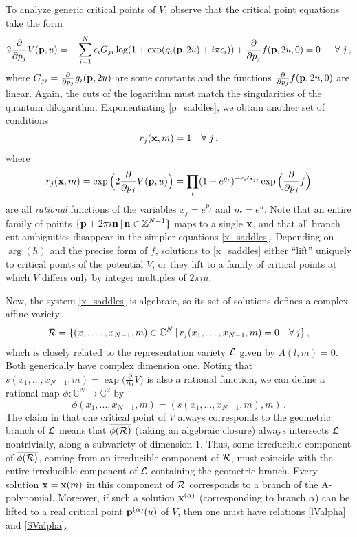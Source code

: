 \documentclass[hyper]{JHEP3}
\def\CL {{\cal L}}
\newcommand{\C}{{\mathbb{C}}}
\newcommand{\Z}{{\mathbb{Z}}}
\newcommand\be{\begin{equation}}
\newcommand\ee{\end{equation}}
\begin{document}
To analyze generic critical points of $V$, observe that the critical point equations
take the form
\be
2 \frac{\partial}{\partial p_j} V({\bf p},u) =
-\sum_{i=1}^{N} \epsilon_i G_{ji} \log(1+\exp(g_i({\bf p},2u)+ i\pi \epsilon_i))
+ \frac{\partial}{\partial p_j} {f} ({\bf p},2u,0) = 0 \quad\;\; \forall\; j\,,
\label{p_saddles}
\ee
where $G_{ji} = \frac{\partial}{\partial p_j} g_i({\bf p},2u)$ are some constants and
the functions $\frac{\partial}{\partial p_j} {f} ({\bf p},2u,0)$ are linear. Again, the cuts of the logarithm must match the singularities of the quantum dilogarithm.
Exponentiating \eqref{p_saddles}, we obtain another set of conditions
\be
r_j ({\bf x},m) = 1 \quad \forall\; j\,,
\label{x_saddles}
\ee
where
\be
r_j({\bf x},m) = \exp \Big( {2 \frac{\partial}{\partial p_j} V({\bf p},u)}\Big)
= \prod_i (1-e^{g_i})^{-\epsilon_i G_{ji}}\exp\Big({\frac{\partial}{\partial p_j}f}\Big)
\ee
%
are all {\it rational} functions of the variables $x_j = e^{p_j}$ and $m = e^u$. Note that an entire family of points $\{{\bf p} + 2\pi i {\bf n} \,|\, {\bf n} \in \Z^{N-1} \}$ maps to a single $\bf x$, and that all branch cut ambiguities disappear in the simpler equations \eqref{x_saddles}. Depending on $\arg(\hbar)$ and the precise form of $f$, solutions to \eqref{x_saddles} either ``lift'' uniquely to critical points of the potential $V$, or they lift to a family of critical points at which $V$ differs only by integer multiples of $2\pi i u$.

Now, the system \eqref{x_saddles} is algebraic,
so its set of solutions defines a complex affine variety
\be
{\cal R} = \{ (x_1, \ldots, x_{N-1},m) \in \C^N \,|\, r_j(x_1, \ldots, x_{N-1},m) = 0 \quad \forall\, j\}\,,
\ee
which is closely related to the representation variety $\CL$ given by $A(l,m)=0$.
Both generically have complex dimension one.
Noting that $s(x_1, \ldots, x_{N-1}, m) = \exp \big( \frac{\partial}{\partial u} V \big)$
is also a rational function, we can define a rational map $\phi:\C^N \to \C^2$ by
\be
\phi (x_1, \ldots, x_{N-1}, m) = (s(x_1, \ldots, x_{N-1},m),m)\,.
\ee
The claim in \cite{hikami-2006} that one critical point of $V$
always corresponds to the geometric branch of $\CL$
means that $\overline{\phi(\cal R)}$ (taking an algebraic closure)
always intersects $\CL$ nontrivially, along a subvariety of dimension 1.
Thus, some irreducible component of $\overline{\phi(\cal R)}$,
coming from an irreducible component of $\cal R$,
must coincide with the entire irreducible component of $\CL$ containing the geometric branch.
Every solution ${\bf x}= {\bf x}(m)$ in this component of $\cal R$
corresponds to a branch of the A-polynomial.
Moreover, if such a solution ${\bf x}^{(\alpha)}$ (corresponding to branch $\alpha$)
can be lifted to a real critical point ${\bf p}^{(\alpha)} (u)$ of $V$,
then one must have relations \eqref{lValpha} and \eqref{SValpha}.
\end{document}
